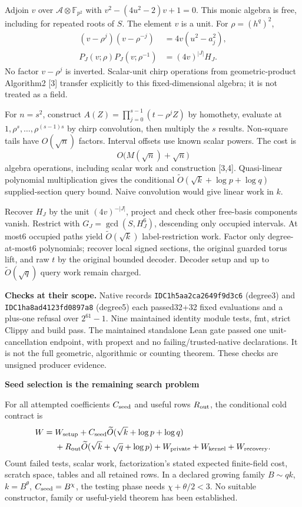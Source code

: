 \documentclass[10pt]{article}
\newcommand{\softO}{\widetilde O}
\begin{document}
Adjoin \(v\) over \(\mathcal A\otimes\mathbb F_{p^2}\) with
\(v^2-(4u^2-2)v+1=0\). This monic algebra is free, including for repeated
roots of \(S\). The element \(v\) is a unit. For \(\rho=(h^q)^2\),
\begin{align*}
(v-\rho^j)(v-\rho^{-j})&=4v(u^2-a_j^2),\\
P_J(v;\rho)P_J(v;\rho^{-1})&=(4v)^{|J|}H_J.
\end{align*}
No factor \(v-\rho^j\) is inverted. Scalar-unit chirp operations from
geometric-product Algorithm2 [3] transfer explicitly to this fixed-dimensional
algebra; it is not treated as a field.

For \(n=s^2\), construct \(A(Z)=\prod_{j=0}^{s-1}(t-\rho^jZ)\) by homothety,
evaluate at \(1,\rho^s,\ldots,\rho^{(s-1)s}\) by chirp convolution, then multiply
the \(s\) results. Non-square tails have \(O(\sqrt n)\) factors. Interval
offsets use known scalar powers. The cost is
\[
O\bigl(M(\sqrt n)+\sqrt n\bigr)
\]
algebra operations, including scalar work and construction [3,4].
Quasi-linear polynomial multiplication gives the conditional
\(\softO(\sqrt k+\log p+\log q)\) supplied-section query bound. Naive
convolution would give linear work in \(k\).

Recover \(H_J\) by the unit \((4v)^{-|J|}\), project and check other free-basis
components vanish. Restrict with \(G_J=\gcd(S,H_J^6)\), descending only occupied
intervals. At most6 occupied paths yield \(\softO(\sqrt k)\) label-restriction
work. Factor only degree-at-most6 polynomials; recover local signed sections,
the original guarded torus lift, and raw \(t\) by the original bounded decoder.
Decoder setup and up to \(\softO(\sqrt q)\) query work remain charged.

\textbf{Checks at their scope.} Native records \texttt{IDC1h5aa2ca2649f9d3c6}
(degree3) and \texttt{IDC1ha8ad4123fd0897a8} (degree5) each passed32+32 fixed
evaluations and a plus-one refusal over \(2^{61}-1\). Nine maintained identity
module tests, fmt, strict Clippy and build pass. The maintained standalone
Lean gate passed one unit-cancellation endpoint, with propext and no
failing/trusted-native declarations. It is not the full geometric, algorithmic
or counting theorem. These checks are unsigned producer evidence.

\newpage
\begin{center}{\Large\bfseries Seed selection is the remaining search problem}\end{center}
For all attempted coefficients \(C_{\rm seed}\) and useful rows \(R_{\rm out}\),
the conditional cold contract is
\begin{align*}
W={}&W_{\rm setup}
 +C_{\rm seed}\softO(\sqrt k+\log p+\log q)\\
&+R_{\rm out}\softO(\sqrt k+\sqrt q+\log p)
 +W_{\rm private}+W_{\rm kernel}+W_{\rm recovery}.
\end{align*}
Count failed tests, scalar work, factorization's stated expected finite-field
cost, scratch space, tables and all retained rows. In a declared growing family
\(B\sim qk\), \(k=B^\theta\), \(C_{\rm seed}=B^\chi\), the testing phase needs
\(\chi+\theta/2<3\). No suitable constructor, family or useful-yield theorem
has been established.
\end{document}
